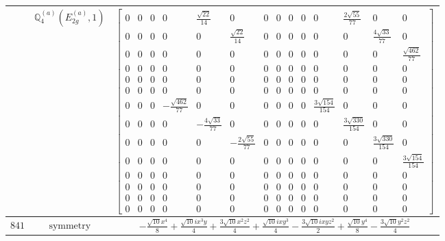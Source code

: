 \documentclass[fleqn,8pt,landscape]{jsarticle}
\begin{document}
\begin{longtable}{ccc}
$  $ & $ \mathbb{Q}_{4}^{(a)}(E_{2g}^{(a)},1) $ & $ \begin{bmatrix} 0 & 0 & 0 & 0 & \frac{\sqrt{22}}{14} & 0 & 0 & 0 & 0 & 0 & 0 & \frac{2 \sqrt{55}}{77} & 0 & 0 \\ 0 & 0 & 0 & 0 & 0 & \frac{\sqrt{22}}{14} & 0 & 0 & 0 & 0 & 0 & 0 & \frac{4 \sqrt{33}}{77} & 0 \\ 0 & 0 & 0 & 0 & 0 & 0 & 0 & 0 & 0 & 0 & 0 & 0 & 0 & \frac{\sqrt{462}}{77} \\ 0 & 0 & 0 & 0 & 0 & 0 & 0 & 0 & 0 & 0 & 0 & 0 & 0 & 0 \\ 0 & 0 & 0 & 0 & 0 & 0 & 0 & 0 & 0 & 0 & 0 & 0 & 0 & 0 \\ 0 & 0 & 0 & 0 & 0 & 0 & 0 & 0 & 0 & 0 & 0 & 0 & 0 & 0 \\ 0 & 0 & 0 & - \frac{\sqrt{462}}{77} & 0 & 0 & 0 & 0 & 0 & 0 & \frac{3 \sqrt{154}}{154} & 0 & 0 & 0 \\ 0 & 0 & 0 & 0 & - \frac{4 \sqrt{33}}{77} & 0 & 0 & 0 & 0 & 0 & 0 & \frac{3 \sqrt{330}}{154} & 0 & 0 \\ 0 & 0 & 0 & 0 & 0 & - \frac{2 \sqrt{55}}{77} & 0 & 0 & 0 & 0 & 0 & 0 & \frac{3 \sqrt{330}}{154} & 0 \\ 0 & 0 & 0 & 0 & 0 & 0 & 0 & 0 & 0 & 0 & 0 & 0 & 0 & \frac{3 \sqrt{154}}{154} \\ 0 & 0 & 0 & 0 & 0 & 0 & 0 & 0 & 0 & 0 & 0 & 0 & 0 & 0 \\ 0 & 0 & 0 & 0 & 0 & 0 & 0 & 0 & 0 & 0 & 0 & 0 & 0 & 0 \\ 0 & 0 & 0 & 0 & 0 & 0 & 0 & 0 & 0 & 0 & 0 & 0 & 0 & 0 \\ 0 & 0 & 0 & 0 & 0 & 0 & 0 & 0 & 0 & 0 & 0 & 0 & 0 & 0 \end{bmatrix} $ \\ \hline
$ 841 $ & $ \text{symmetry} $ & $ - \frac{\sqrt{10} x^{4}}{8} + \frac{\sqrt{10} i x^{3} y}{4} + \frac{3 \sqrt{10} x^{2} z^{2}}{4} + \frac{\sqrt{10} i x y^{3}}{4} - \frac{3 \sqrt{10} i x y z^{2}}{2} + \frac{\sqrt{10} y^{4}}{8} - \frac{3 \sqrt{10} y^{2} z^{2}}{4} $ \\

\end{longtable}
\end{document}
